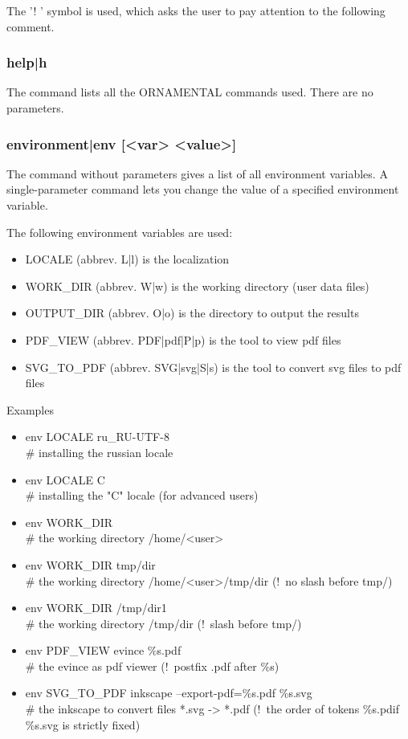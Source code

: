 \documentclass[a4paper]{article}
\begin{document}
The '! ' symbol is used, which asks the user to pay attention to the following comment.

\subsubsection{help|h} 
The command lists all the ORNAMENTAL commands used. There are no parameters.

\subsubsection{environment|env [<var> <value>]}
The command without parameters gives a list of all environment variables.
A single-parameter command lets you change the value of a specified environment variable.

The following environment variables are used:
\begin{itemize}
\item LOCALE (abbrev. L|l) is the localization
\item WORK\_DIR (abbrev. W|w) is the working directory (user data files) 
\item OUTPUT\_DIR (abbrev. O|o) is the directory to output the results
\item PDF\_VIEW (abbrev. PDF|pdf|P|p) is the tool to view pdf files
\item SVG\_TO\_PDF (abbrev. SVG|svg|S|s) is the tool to convert svg files to pdf files
\end{itemize}
 
Examples
\begin{itemize}
\item env LOCALE ru\_RU-UTF-8 
\\ \# installing the russian locale

\item env LOCALE C 
\\ \# installing the "C" locale (for advanced users)

\item env WORK\_DIR ~ 
\\ \# the working directory /home/<user>

\item env WORK\_DIR tmp/dir 
\\ \# the working directory /home/<user>/tmp/dir (!~no slash before tmp/)

\item env WORK\_DIR /tmp/dir1 
\\ \# the working directory /tmp/dir (!~slash before tmp/)

\item env PDF\_VIEW evince \%s.pdf 
\\ \# the evince as pdf viewer (!~postfix .pdf after \%s)

\item env SVG\_TO\_PDF inkscape --export-pdf=\%s.pdf \%s.svg 
\\ \# the inkscape to convert files *.svg -> *.pdf (!~the order of tokens \%s.pdif \%s.svg is strictly fixed)
\end{itemize}
\end{document}
